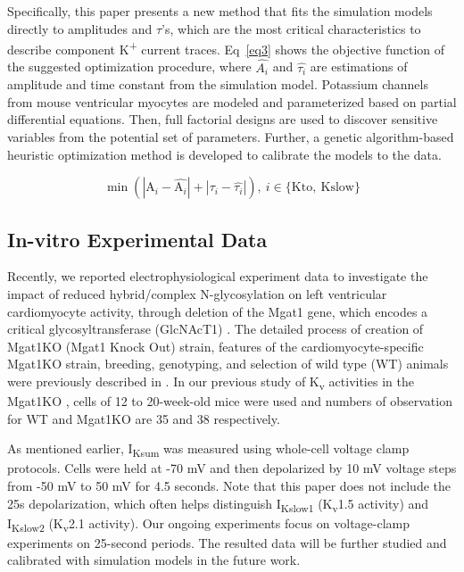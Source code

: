 \documentclass[10pt,letterpaper]{article}
\begin{document}
Specifically, this paper presents a new method that fits the simulation models directly to amplitudes and $\tau$'s, which are the most critical characteristics to describe component K\textsuperscript{+} current traces. Eq~\ref{eq3} shows the objective function of the suggested optimization procedure, where $\hat{A_i}$ and $\hat{\tau_i}$ are estimations of amplitude and time constant from the simulation model. Potassium channels from mouse ventricular myocytes are modeled and parameterized based on partial differential equations. Then, full factorial designs are used to discover sensitive variables from the potential set of parameters. Further, a genetic algorithm-based heuristic optimization method is developed to calibrate the models to the data.

\begin{equation}
    \min (|\mathrm{A}_i - \hat{\mathrm{A}_i}| + |\tau_i - \hat{\tau_i}|), \ i \in \{\mathrm{Kto},\ \mathrm{Kslow}\}
    \label{eq3}
\end{equation}

\subsection*{In-vitro Experimental Data}
Recently, we reported electrophysiological experiment data to investigate the impact of reduced hybrid/complex N-glycosylation on left ventricular cardiomyocyte activity, through deletion of the Mgat1 gene, which encodes a critical glycosyltransferase (GlcNAcT1) \cite{ednie2019reduced, ednie2019reduced2}. The detailed process of creation of Mgat1KO (Mgat1 Knock Out) strain, features of the cardiomyocyte-specific Mgat1KO strain, breeding, genotyping, and selection of wild type (WT) animals were previously described in \cite{ednie2019reduced2}. In our previous study of K\textsubscript{v} activities in the Mgat1KO \cite{ednie2019reduced}, cells of 12 to 20-week-old mice were used and numbers of observation for WT and Mgat1KO are 35 and 38 respectively.

As mentioned earlier, I\textsubscript{Ksum} was measured using whole-cell voltage clamp protocols. Cells were held at -70 mV and then depolarized by 10 mV voltage steps from -50 mV to 50 mV for 4.5 seconds. Note that this paper does not include the 25s depolarization, which often helps distinguish I\textsubscript{Kslow1} (K\textsubscript{v}1.5 activity) and I\textsubscript{Kslow2} (K\textsubscript{v}2.1 activity). Our ongoing experiments focus on voltage-clamp experiments on 25-second periods. The resulted data will be further studied and calibrated with simulation models in the future work.
\end{document}
